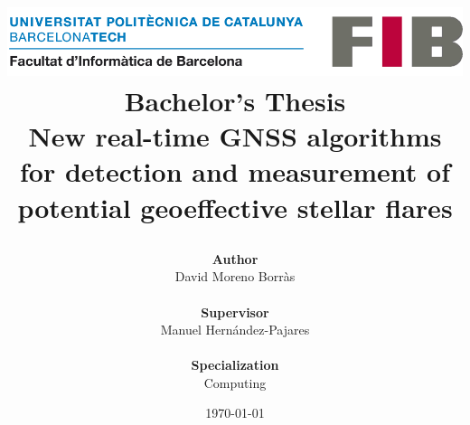 \title{
	{
	\includegraphics[width=0.7\linewidth]{images/cover/logo-fib.png}	
	\vspace{1cm} \\
	\textbf{Bachelor's Thesis} \\
	\large New real-time GNSS algorithms for detection and measurement of potential geoeffective stellar flares}
\author{\textbf{Author}\\
	David Moreno Borr\`as
	\\ \\
	\textbf{Supervisor}\\
	Manuel Hernández-Pajares
	\\ \\
	\textbf{Specialization}\\
	Computing
} 
	\vspace{1.3cm}
\date{\today}
}
\maketitle
\thispagestyle{empty}
